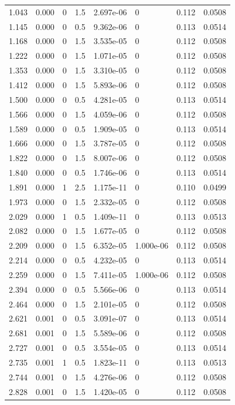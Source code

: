 \documentclass[preview]{standalone}
\begin{document}
{{\begin{tabular}{L{1.2cm}C{1.2cm} C{0.3cm}C{0.5cm} C{1.4cm}C{1.4cm} C{1.4cm}C{1.4cm}}
  1.043  &  0.000  & 0     & 1.5 &  2.697e-06  & 0  & 0.112 &  0.0508   \\ 
  1.145  &  0.000  & 0     & 0.5 &  9.362e-06  & 0  & 0.113 &  0.0514   \\ 
  1.168  &  0.000  & 0     & 1.5 &  3.535e-05  & 0  & 0.112 &  0.0508   \\ 
  1.222  &  0.000  & 0     & 1.5 &  1.071e-05  & 0  & 0.112 &  0.0508   \\ 
  1.353  &  0.000  & 0     & 1.5 &  3.310e-05  & 0  & 0.112 &  0.0508   \\ 
  1.412  &  0.000  & 0     & 1.5 &  5.893e-06  & 0  & 0.112 &  0.0508   \\ 
  1.500  &  0.000  & 0     & 0.5 &  4.281e-05  & 0  & 0.113 &  0.0514   \\ 
  1.566  &  0.000  & 0     & 1.5 &  4.059e-06  & 0  & 0.112 &  0.0508   \\ 
  1.589  &  0.000  & 0     & 0.5 &  1.909e-05  & 0  & 0.113 &  0.0514   \\ 
  1.666  &  0.000  & 0     & 1.5 &  3.787e-05  & 0  & 0.112 &  0.0508   \\ 
  1.822  &  0.000  & 0     & 1.5 &  8.007e-06  & 0  & 0.112 &  0.0508   \\ 
  1.840  &  0.000  & 0     & 0.5 &  1.746e-06  & 0  & 0.113 &  0.0514   \\ 
  1.891  &  0.000  & 1     & 2.5 &  1.175e-11  & 0  & 0.110 &  0.0499   \\ 
  1.973  &  0.000  & 0     & 1.5 &  2.332e-05  & 0  & 0.112 &  0.0508   \\ 
  2.029  &  0.000  & 1     & 0.5 &  1.409e-11  & 0  & 0.113 &  0.0513   \\ 
  2.082  &  0.000  & 0     & 1.5 &  1.677e-05  & 0  & 0.112 &  0.0508   \\ 
  2.209  &  0.000  & 0     & 1.5 &  6.352e-05  & 1.000e-06  & 0.112 &  0.0508   \\ 
  2.214  &  0.000  & 0     & 0.5 &  4.232e-05  & 0  & 0.113 &  0.0514   \\ 
  2.259  &  0.000  & 0     & 1.5 &  7.411e-05  & 1.000e-06  & 0.112 &  0.0508   \\ 
  2.394  &  0.000  & 0     & 0.5 &  5.566e-06  & 0  & 0.113 &  0.0514   \\ 
  2.464  &  0.000  & 0     & 1.5 &  2.101e-05  & 0  & 0.112 &  0.0508   \\ 
  2.621  &  0.001  & 0     & 0.5 &  3.091e-07  & 0  & 0.113 &  0.0514   \\ 
  2.681  &  0.001  & 0     & 1.5 &  5.589e-06  & 0  & 0.112 &  0.0508   \\ 
  2.727  &  0.001  & 0     & 0.5 &  3.554e-05  & 0  & 0.113 &  0.0514   \\ 
  2.735  &  0.001  & 1     & 0.5 &  1.823e-11  & 0  & 0.113 &  0.0513   \\ 
  2.744  &  0.001  & 0     & 1.5 &  4.276e-06  & 0  & 0.112 &  0.0508   \\ 
  2.828  &  0.001  & 0     & 1.5 &  1.420e-05  & 0  & 0.112 &  0.0508   \\ 
\hline 
\end{tabular} 

}}
\end{document}
